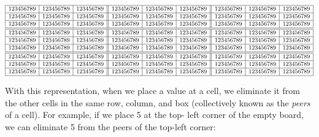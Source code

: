 \documentclass{book}
\begin{document}
\[
\small
\begin{array}{|c|c|c||c|c|c||c|c|c|}
\hline
123456789 & 123456789 & 123456789 & 123456789 & 123456789 & 123456789 & 123456789 & 123456789 & 123456789 \\
\hline
123456789 & 123456789 & 123456789 & 123456789 & 123456789 & 123456789 & 123456789 & 123456789 & 123456789 \\
\hline
123456789 & 123456789 & 123456789 & 123456789 & 123456789 & 123456789 & 123456789 & 123456789 & 123456789 \\
\hline \hline
123456789 & 123456789 & 123456789 & 123456789 & 123456789 & 123456789 & 123456789 & 123456789 & 123456789 \\
\hline
123456789 & 123456789 & 123456789 & 123456789 & 123456789 & 123456789 & 123456789 & 123456789 & 123456789 \\
\hline
123456789 & 123456789 & 123456789 & 123456789 & 123456789 & 123456789 & 123456789 & 123456789 & 123456789 \\
\hline \hline
123456789 & 123456789 & 123456789 & 123456789 & 123456789 & 123456789 & 123456789 & 123456789 & 123456789 \\
\hline
123456789 & 123456789 & 123456789 & 123456789 & 123456789 & 123456789 & 123456789 & 123456789 & 123456789 \\
\hline
123456789 & 123456789 & 123456789 & 123456789 & 123456789 & 123456789 & 123456789 & 123456789 & 123456789 \\
\hline
\end{array}
\]

With this representation, when we place a value at a cell, we eliminate it
from the other cells in the same row, column, and box (collectively known
as the \emph{peers} of a cell). For example, if we place 5 at the top-
left corner of the empty board, we can eliminate 5 from the peers of the
top-left corner:
\end{document}
